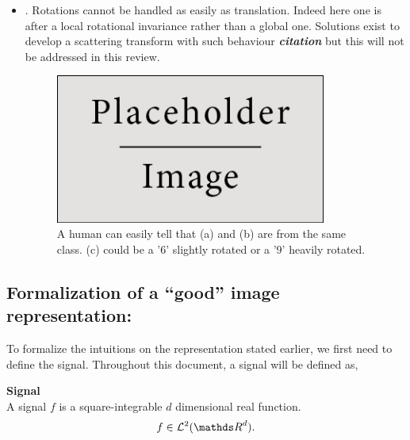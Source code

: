 \documentclass[a4paper,11pt]{report}
\begin{document}
\begin{itemize}
				\item {}. Rotations cannot be handled as easily as translation. Indeed here one is after a local rotational invariance rather than a global one. Solutions exist to develop a scattering transform with such behaviour \textbf{\textit{citation}} but this will not be addressed in this review. %
			
					\begin{figure}
					  \begin{center}
					    \includegraphics[width=3.5in]{placeholder.jpg}
					    \caption[Rotation invariance]{A human can easily tell that (a) and (b) are from the same class. (c) could be a  '6' slightly rotated or a '9' heavily rotated.}
					    \label{fig:Illustration rotation invariance}
					  \end{center}
					\end{figure}	
			  	\end{itemize}
      
		\subsection{Formalization of a ``good'' image representation:}
      \label{seq:Intro/Image rep/Formalization}
      
      To formalize the intuitions on the representation stated earlier, we first need to define the signal. Throughout this document, a signal will be defined as,
			
			\begin{defn} \textbf{Signal}\\ 
				A signal $f$ is a square-integrable $d$ dimensional real function.
				\begin{equation*}
					f \in \mathcal{L}^{2}(\dsR^{d}).
				\end{equation*}
				\label{def:Signal}
			\end{defn}
			
\end{document}
